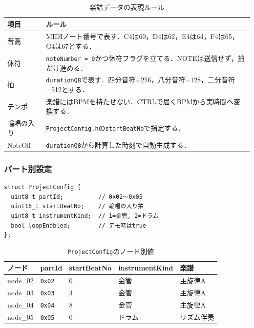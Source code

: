 \documentclass[lualatex,book,paper=a4paper,jafontsize=11.5pt,jafontscale=1.05]{jlreq}
\newcommand{\code}[1]{\texttt{#1}}
\begin{document}
\begin{table}[H]
\centering
\caption{楽譜データの表現ルール}
\label{tab:notation-rule}
\begin{tabular}{p{}p{}}
\toprule
\textbf{項目} & \textbf{ルール} \\
\midrule
音高 & MIDIノート番号で表す．C4は60，D4は62，E4は64，F4は65，G4は67とする．\\
休符 & \code{noteNumber = 0}かつ休符フラグを立てる．NOTEは送信せず，拍だけ進める．\\
拍 & \code{durationQ8}で表す．四分音符=256，八分音符=128，二分音符=512とする．\\
テンポ & 楽譜にはBPMを持たせない．CTRLで届くBPMから実時間へ変換する．\\
輪唱の入り & \code{ProjectConfig.h}の\code{startBeatNo}で指定する．\\
NoteOff & \code{durationQ8}から計算した時刻で自動生成する．\\
\bottomrule
\end{tabular}
\end{table}

\subsubsection{パート別設定}

\begin{verbatim}
struct ProjectConfig {
  uint8_t partId;          // 0x02〜0x05
  uint16_t startBeatNo;    // 輪唱の入り拍
  uint8_t instrumentKind;  // 1=金管, 2=ドラム
  bool loopEnabled;        // デモ時はtrue
};
\end{verbatim}

\begin{table}[H]
\centering
\caption{\code{ProjectConfig}のノード別値}
\label{tab:config-values}
\begin{tabular}{p{}p{}p{}p{}p{}}
\toprule
\textbf{ノード} & \textbf{partId} & \textbf{startBeatNo} & \textbf{instrumentKind} & \textbf{楽譜} \\
\midrule
node\_02 & \code{0x02} & 0 & 金管 & 主旋律A \\
node\_03 & \code{0x03} & 4 & 金管 & 主旋律A \\
node\_04 & \code{0x04} & 8 & 金管 & 主旋律A \\
node\_05 & \code{0x05} & 0 & ドラム & リズム伴奏 \\
\bottomrule
\end{tabular}
\end{table}
\end{document}
